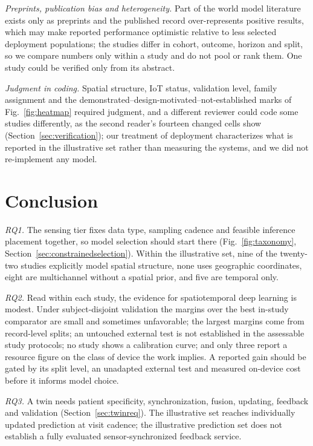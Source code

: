 \documentclass[journal]{IEEEtran}
\begin{document}
\emph{Preprints, publication bias and heterogeneity.} Part of the world model literature exists only as preprints and the published record over-represents positive results, which may make reported performance optimistic relative to less selected deployment populations; the studies differ in cohort, outcome, horizon and split, so we compare numbers only within a study and do not pool or rank them. One study could be verified only from its abstract.

\emph{Judgment in coding.} Spatial structure, IoT status, validation level, family assignment and the demonstrated--design-motivated--not-established marks of Fig.~\ref{fig:heatmap} required judgment, and a different reviewer could code some studies differently, as the second reader's fourteen changed cells show (Section~\ref{sec:verification}); our treatment of deployment characterizes what is reported in the illustrative set rather than measuring the systems, and we did not re-implement any model.

\section{Conclusion}
\label{sec:conclusion}
\emph{RQ1.} The sensing tier fixes data type, sampling cadence and feasible inference placement together, so model selection should start there (Fig.~\ref{fig:taxonomy}, Section~\ref{sec:constrainedselection}). Within the illustrative set, nine of the twenty-two studies explicitly model spatial structure, none uses geographic coordinates, eight are multichannel without a spatial prior, and five are temporal only.

\emph{RQ2.} Read within each study, the evidence for spatiotemporal deep learning is modest. Under subject-disjoint validation the margins over the best in-study comparator are small and sometimes unfavorable; the largest margins come from record-level splits; an untouched external test is not established in the assessable study protocols; no study shows a calibration curve; and only three report a resource figure on the class of device the work implies. A reported gain should be gated by its split level, an unadapted external test and measured on-device cost before it informs model choice.

\emph{RQ3.} A twin needs patient specificity, synchronization, fusion, updating, feedback and validation (Section~\ref{sec:twinreq}). The illustrative set reaches individually updated prediction at visit cadence; the illustrative prediction set does not establish a fully evaluated sensor-synchronized feedback service.
\end{document}
